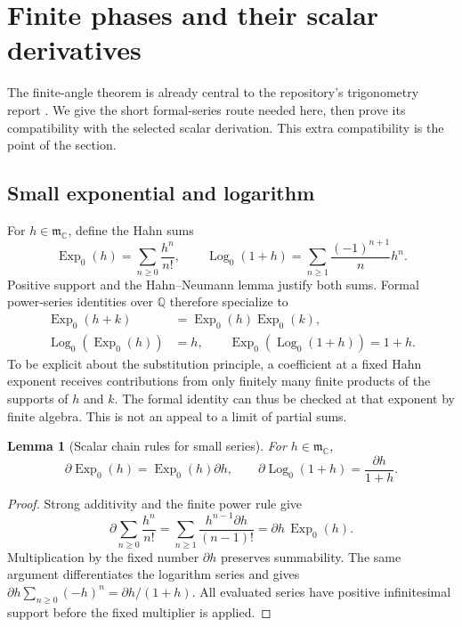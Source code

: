 \documentclass[11pt,a4paper]{article}
\newtheorem{lemma}[theorem]{Lemma}
\theoremstyle{definition}
\newcommand{\C}{\mathbb C}
\newcommand{\Q}{\mathbb Q}
\newcommand{\D}{\partial}
\newcommand{\mm}{\mathfrak m}
\newcommand{\Expzero}{\operatorname{Exp}_0}
\newcommand{\Logzero}{\operatorname{Log}_0}
\numberwithin{equation}{section}
\begin{document}
\section{Finite phases and their scalar derivatives}\label{sec:phase}

The finite-angle theorem is already central to the repository's
trigonometry report \cite{RepoTrig}. We give the short formal-series route
needed here, then prove its compatibility with the selected scalar
derivation. This extra compatibility is the point of the section.

\subsection{Small exponential and logarithm}
For $h\in\mm_\C$, define the Hahn sums
\begin{equation}\label{eq:smallfunctions}
 \Expzero(h)=\sum_{n\ge0}\frac{h^n}{n!},\qquad
 \Logzero(1+h)=\sum_{n\ge1}\frac{(-1)^{n+1}}n h^n.
\end{equation}
Positive support and the Hahn--Neumann lemma justify both sums. Formal
power-series identities over $\Q$ therefore specialize to
\begin{align}
 \Expzero(h+k)&=\Expzero(h)\Expzero(k),\label{eq:smallgroup}\\
 \Logzero(\Expzero(h))&=h,\qquad
 \Expzero(\Logzero(1+h))=1+h.\label{eq:smallinverse}
\end{align}
To be explicit about the substitution principle, a coefficient at a fixed
Hahn exponent receives contributions from only finitely many finite
products of the supports of $h$ and $k$. The formal identity can thus be
checked at that exponent by finite algebra. This is not an appeal to a
limit of partial sums.

\begin{lemma}[Scalar chain rules for small series]\label{lem:smallchain}
For $h\in\mm_\C$,
\[
 \D\Expzero(h)=\Expzero(h)\D h,\qquad
 \D\Logzero(1+h)=\frac{\D h}{1+h}.
\]
\end{lemma}
\begin{proof}
Strong additivity and the finite power rule give
\[
 \D\sum_{n\ge0}\frac{h^n}{n!}
 =\sum_{n\ge1}\frac{h^{n-1}\D h}{(n-1)!}
 =\D h\,\Expzero(h).
\]
Multiplication by the fixed number $\D h$ preserves summability. The same
argument differentiates the logarithm series and gives
$\D h\sum_{n\ge0}(-h)^n=\D h/(1+h)$. All evaluated series have positive
infinitesimal support before the fixed multiplier is applied.
\end{proof}
\end{document}
